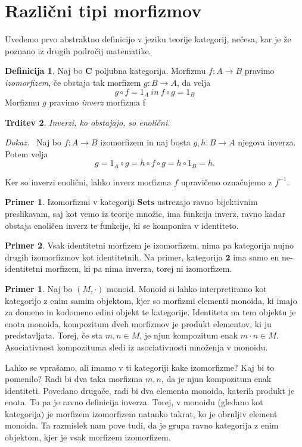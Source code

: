 \documentclass[12pt,a4paper]{book}
\theoremstyle{definition}
\newtheorem{definicija}{Definicija}[chapter]
\theoremstyle{plain}
\newtheorem{trditev}[definicija]{Trditev}
\newenvironment{dokaz}{\emph{Dokaz.}\ }{\hspace{\fill}{$\Box$}}
\theoremstyle{definition}
\newtheorem{primer}{Primer}[section]
\newtheorem*{primer*}{Primer}
\theoremstyle{remark}
\newcommand{\cat}[1]{\textbf{#1}}
\begin{document}
\section{Različni tipi morfizmov}
Uvedemo prvo abstraktno definicijo v jeziku teorije kategorij, nečesa, kar je že poznano iz drugih področij matematike.

\begin{definicija} Naj bo \cat{C} poljubna kategorija. Morfizmu $f : A \to B$ pravimo \emph{izomorfizem}, če obstaja tak morfizem $g : B \to A$, da velja
$$g \circ f = 1_A \ in \ f \circ g = 1_B$$
Morfizmu $g$ pravimo \emph{inverz} morfizma f
\end{definicija}

\begin{trditev} Inverzi, ko obstajajo, so enolični.
\end{trditev}
\begin{dokaz}
Naj bo $f : A \to B$ izomorfizem in naj bosta $g,h: B \to A$ njegova inverza. Potem velja 
$$g = 1_A \circ g = h \circ f \circ g = h \circ 1_B = h.$$
\end{dokaz}

Ker so inverzi enolični, lahko inverz morfizma $f$ upravičeno označujemo z $f^{-1}$.

\begin{primer*}
Izomorfizmi v kategoriji $\cat{Sets}$ ustrezajo ravno bijektivnim preslikavam, saj kot vemo iz teorije množic, ima funkcija inverz, ravno kadar obstaja enoličen inverz te funkcije, ki se komponira v identiteto. 
\end{primer*}

\begin{primer*}
Vsak identitetni morfizem je izomorfizem, nima pa kategorija nujno drugih izomorfizmov kot identitetnih. Na primer, kategorija $\cat{2}$ ima samo en ne-identitetni morfizem, ki pa nima inverza, torej ni izomorfizem.
\end{primer*}

\begin{primer}
Naj bo $(M,\cdot)$ monoid. Monoid si lahko interpretiramo kot kategorijo z enim samim objektom, kjer so morfizmi elementi monoida, ki imajo za domeno in kodomeno edini objekt te kategorije. Identiteta na tem objektu je enota monoida, kompozitum dveh morfizmov je produkt elementov, ki ju predstavljata. Torej, če sta $m,n \in M$, je njun kompozitum enak $m \cdot n \in M$. Asociativnost kompozituma sledi iz asociativnosti množenja v monoidu.

Lahko se vprašamo, ali imamo v ti kategoriji kake izomorfizme? Kaj bi to pomenilo? Radi bi dva taka morfizma $m,n$, da je njun kompozitum enak identiteti. Povedano drugače, radi bi dva elementa monoida, katerih produkt je enota. To pa je ravno definicija inverza. Torej, v monoidu (gledano kot kategorija) je morfizem izomorfizem natanko takrat, ko je obrnljiv element monoida. Ta razmislek nam pove tudi, da je grupa ravno kategorija z enim objektom, kjer je vsak morfizem izomorfizem.
\end{primer}
\end{document}
